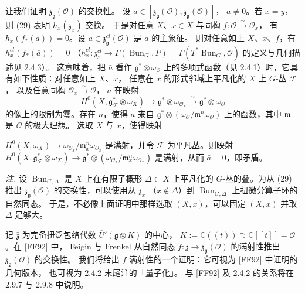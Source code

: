  让我们证明 $\mathfrak{z}_{\mathfrak{g}}(\mathcal{O})$ 的交换性。
设 $a\in[\mathfrak{z}_{\mathfrak{g}}(\mathcal{O}),\mathfrak{z}_{\mathfrak{g}}(\mathcal{O})]$，
$a\neq 0$。若 $x=y$，则 (29) 表明 $h_x(\mathfrak{z}_x)$ 交换。
于是对任意 $X$、$x\in X$ 与同构 $f:\mathcal{O}\xrightarrow{\sim}\mathcal{O}_x$，
有 $h_x(f_*(a))=0$。设
$\bar{a}\in\mathfrak{z}^{cl}_{\mathfrak{g}}(\mathcal{O})$ 是 $a$ 的主象征。
则对任意如上 $X$、$x$、$f$，有 $h_x^{cl}(f_*(\bar{a}))=0$
（$h_x^{cl}:\mathfrak{z}^{cl}_x\to\Gamma(\operatorname{Bun}_G,P)
=\Gamma(T^*\operatorname{Bun}_G,\mathcal{O})$ 的定义与几何描述见 2.4.3）。
这意味着，把 $\bar{a}$ 看作 $\mathfrak{g}^*\otimes\omega_{\mathcal{O}}$
上的多项式函数（见 2.4.1）时，它具有如下性质：对任意如上 $X$、$x$，
任意在 $x$ 的形式邻域上平凡化的 $X$ 上 $G$-丛 $\mathcal{F}$，
以及任意同构 $\mathcal{O}_x\xrightarrow{\sim}\mathcal{O}$，
$\bar{a}$ 在映射
\[
  H^0(X,\mathfrak{g}^*_{\mathcal{F}}\otimes\omega_X)\longrightarrow
  \mathfrak{g}^*\otimes\omega_{\mathcal{O}_x}\xrightarrow{\sim}
  \mathfrak{g}^*\otimes\omega_{\mathcal{O}}
\]
的像上的限制为零。存在 $n$，使得 $\bar{a}$ 来自
$\mathfrak{g}^*\otimes(\omega_{\mathcal{O}}/\mathfrak{m}^n\omega_{\mathcal{O}})$
上的函数，其中 $\mathfrak{m}$ 是 $\mathcal{O}$ 的极大理想。
选取 $X$ 与 $x$，使得映射


$H^0(X,\omega_X)\to\omega_{\mathcal{O}_x}/\mathfrak{m}^n_x\omega_{\mathcal{O}_x}$
是满射，并令 $\mathcal{F}$ 为平凡丛。则映射
$H^0(X,\mathfrak{g}^*_{\mathcal{F}}\otimes\omega_X)\to
\mathfrak{g}^*\otimes(\omega_{\mathcal{O}_x}/\mathfrak{m}^n_x\omega_{\mathcal{O}_x})$
是满射，从而 $\bar{a}=0$，即矛盾。

\emph{注.} 设 $\operatorname{Bun}_{G,\Delta}$ 是 $X$ 上在有限子概形
$\Delta\subset X$ 上平凡化的 $G$-丛的叠。为从 (29) 推出
$\mathfrak{z}_{\mathfrak{g}}(\mathcal{O})$ 的交换性，可以使用从 $\mathfrak{z}_x$
（$x\notin\Delta$）到 $\operatorname{Bun}_{G,\Delta}$ 上扭微分算子环的自然同态。
于是，不必像上面证明中那样选取 $(X,x)$，可以固定 $(X,x)$ 并取 $\Delta$ 足够大。

 记 $\bar{\mathfrak{z}}$ 为完备扭泛包络代数
$\overline{U}'(\mathfrak{g}\otimes K)$ 的中心，
$K:=\mathbb{C}((t))\supset\mathbb{C}[[t]]=\mathcal{O}$。在 [FF92] 中，
Feigin 与 Frenkel 从自然同态
$f:\bar{\mathfrak{z}}\to\mathfrak{z}_{\mathfrak{g}}(\mathcal{O})$
的满射性推出 $\mathfrak{z}_{\mathfrak{g}}(\mathcal{O})$ 的交换性。
我们将给出 $f$ 满射性的一个证明：它可视为 [FF92] 中证明的几何版本，
也可视为 2.4.2 末尾注的「量子化」。
与 [FF92] 及 2.4.2 的关系将在 2.9.7 与 2.9.8 中说明。

